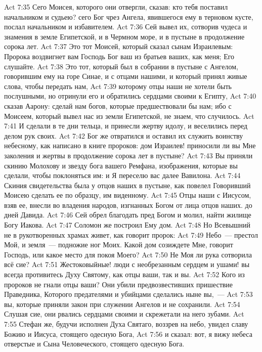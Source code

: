 \vs Act 7:35 Сего Моисея, которого они отвергли, сказав: кто тебя поставил начальником и судьею? сего Бог чрез Ангела, явившегося ему в терновом кусте, послал начальником и избавителем.
\vs Act 7:36 Сей вывел их, сотворив чудеса и знамения в земле Египетской, и в Чермном море, и в пустыне в продолжение сорока лет.
\vs Act 7:37 Это тот Моисей, который сказал сынам Израилевым: Пророка воздвигнет вам Господь Бог ваш из братьев ваших, как меня; Его слушайте.
\vs Act 7:38 Это тот, который был в собрании в пустыне с Ангелом, говорившим ему на горе Синае, и с отцами нашими, и который принял живые слова, чтобы передать нам,
\vs Act 7:39 которому отцы наши не хотели быть послушными, но отринули его и обратились сердцами своими к Египту,
\vs Act 7:40 сказав Аарону: сделай нам богов, которые предшествовали бы нам; ибо с Моисеем, который вывел нас из земли Египетской, не знаем, что случилось.
\vs Act 7:41 И сделали в те дни тельца, и принесли жертву идолу, и веселились перед делом рук своих.
\vs Act 7:42 Бог же отвратился и оставил их служить воинству небесному, как написано в книге пророков: дом Израилев! приносили ли вы Мне заколения и жертвы в продолжение сорока лет в пустыне?
\vs Act 7:43 Вы приняли скинию Молохову и звезду бога вашего Ремфана, изображения, которые вы сделали, чтобы поклоняться им: и Я переселю вас далее Вавилона.
\vs Act 7:44 Скиния свидетельства была у отцов наших в пустыне, как повелел Говоривший Моисею сделать ее по образцу, им виденному.
\vs Act 7:45 Отцы наши с Иисусом, взяв ее, внесли во владения народов, изгнанных Богом от лица отцов наших.  до дней Давида.
\vs Act 7:46 Сей обрел благодать пред Богом и молил,  найти жилище Богу Иакова.
\vs Act 7:47 Соломон же построил Ему дом.
\vs Act 7:48 Но Всевышний не в рукотворенных храмах живет, как говорит пророк:
\vs Act 7:49 Небо~--- престол Мой, и земля~--- подножие ног Моих. Какой дом созиждете Мне, говорит Господь, или какое место для покоя Моего?
\vs Act 7:50 Не Моя ли рука сотворила всё сие?
\vs Act 7:51 Жестоковыйные! люди с необрезанным сердцем и ушами! вы всегда противитесь Духу Святому, как отцы ваши, так и вы.
\vs Act 7:52 Кого из пророков не гнали отцы ваши? Они убили предвозвестивших пришествие Праведника, Которого предателями и убийцами сделались ныне вы,~---
\vs Act 7:53 вы, которые приняли закон при служении Ангелов и не сохранили.
\rsbpar\vs Act 7:54 Слушая сие, они рвались сердцами своими и скрежетали на него зубами.
\vs Act 7:55 Стефан же, будучи исполнен Духа Святаго, воззрев на небо, увидел славу Божию и Иисуса, стоящего одесную Бога,
\vs Act 7:56 и сказал: вот, я вижу небеса отверстые и Сына Человеческого, стоящего одесную Бога.
